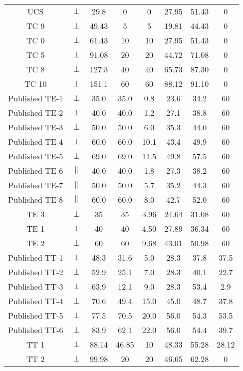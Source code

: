 \begin{table}
\begin{tabular}{cccccccc}
        UCS   & \(\perp\) & 29.8 & 0 & 0   & 27.95 & 51.43 & 0 \\ 
        TC 9  & \(\perp\) & 49.43 & 5  & 5 & 19.81 & 44.43 & 0 \\ 
        TC 0  & \(\perp\) & 61.43 & 10 & 10 & 27.95 & 51.43 & 0 \\ 
        TC 5  & \(\perp\) & 91.08 & 20 & 20 & 44.72 & 71.08 & 0 \\ 
        TC 8  & \(\perp\) & 127.3 & 40 & 40 & 65.73 & 87.30 & 0 \\ 
        TC 10 & \(\perp\) & 151.1 & 60 & 60 & 88.12 & 91.10 & 0 \\ 
        \hline
        \hline
        Published TE-1 & \(\perp\) & 35.0 & 35.0 & 0.8 & 23.6 & 34.2 & 60 \\
        Published TE-2 & \(\perp\) & 40.0 & 40.0 & 1.2 & 27.1 & 38.8 & 60 \\
        Published TE-3 & \(\perp\) & 50.0 & 50.0 & 6.0 & 35.3 & 44.0 & 60 \\
        Published TE-4 & \(\perp\) & 60.0 & 60.0 & 10.1 & 43.4 & 49.9 & 60 \\
        Published TE-5 & \(\perp\) & 69.0 & 69.0 & 11.5 & 49.8 & 57.5 & 60 \\
        Published TE-6 & \(\|\) & 40.0 & 40.0 & 1.8 & 27.3 & 38.2 & 60 \\
        Published TE-7 & \(\|\) & 50.0 & 50.0 & 5.7 & 35.2 & 44.3 & 60 \\
        Published TE-8 & \(\|\) & 60.0 & 60.0 & 8.0 & 42.7 & 52.0 & 60 \\
        TE 3  & \(\perp\) & 35 & 35 & 3.96 & 24.64 & 31.08 & 60 \\ 
        TE 1  & \(\perp\) & 40 & 40 & 4.50 & 27.89 & 36.34 & 60 \\ 
        TE 2  & \(\perp\) & 60 & 60 & 9.68 & 43.01 & 50.98 & 60 \\
        \hline
        \hline
        Published TT-1 & \(\perp\) & 48.3 & 31.6 & 5.0 & 28.3 & 37.8 & 37.5 \\
        Published TT-2 & \(\perp\) & 52.9 & 25.1 & 7.0 & 28.3 & 40.1 & 22.7 \\
        Published TT-3 & \(\perp\) & 63.9 & 12.1 & 9.0 & 28.3 & 53.4 & 2.9 \\
        Published TT-4 & \(\perp\) & 70.6 & 49.4 & 15.0 & 45.0 & 48.7 & 37.8 \\
        Published TT-5 & \(\perp\) & 77.5 & 70.5 & 20.0 & 56.0 & 54.3 & 53.5 \\
        Published TT-6 & \(\perp\) & 83.9 & 62.1 & 22.0 & 56.0 & 54.4 & 39.7 \\
        TT 1 & \(\perp\) & 88.14 & 46.85 & 10 & 48.33 & 55.28 & 28.12 \\
        TT 2 & \(\perp\) & 99.98 & 20 & 20 & 46.65 & 62.28 & 0 \\
        \hline
    \end{tabular}
    \label{tb5:database}
\end{table}

